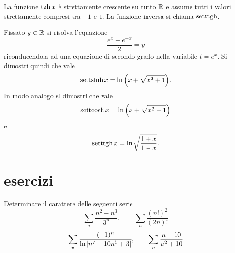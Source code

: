 La funzione $\operatorname{tgh} x$ è strettamente crescente su tutto $\mathbb R$ e assume tutti i valori strettamente compresi tra $-1$ e $1$.
La funzione inversa si chiama $\operatorname{setttgh}$.

\begin{exercise}
Fissato $y\in \mathbb R$ si risolva l'equazione
\[
  \frac{e^x - e^{-x}}{2} = y
\]
riconducendola ad una equazione di secondo grado nella variabile $t=e^x$.
Si dimostri quindi che vale
\[
  \operatorname{settsinh} x = \ln{\left( x + \sqrt{x^2 + 1} \right)}.
\]
In modo analogo si dimostri che vale
\[
  \operatorname{settcosh} x = \ln{\left( x + \sqrt{x^2 - 1} \right)}
\]
e
\[
  \operatorname{setttgh} x = \ln \sqrt{\frac{1+x}{1-x}}.
\]
\end{exercise}


\section{esercizi}
\begin{exercise}
Determinare il carattere delle seguenti serie
\[
  \sum_n \frac{n^2-n^3}{3^n}, \qquad
  \sum_n \frac{(n!)^2}{(2n)!}
\]
\[
\sum_n \frac{(-1)^n}{\ln{\left|n^7 - 10n^5 + 3\right|}},  \qquad
\sum_n \frac{n-10}{n^2+10}
\]
\end{exercise}

